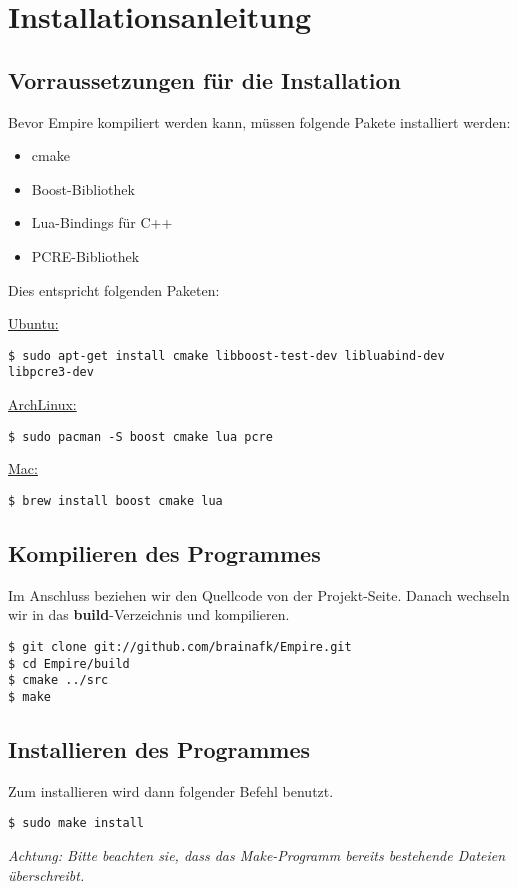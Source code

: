 
\section{Installationsanleitung}

\subsection{Vorraussetzungen für die Installation}
Bevor Empire kompiliert werden kann, müssen folgende Pakete installiert werden:

\begin{itemize}
	\item cmake
	\item Boost-Bibliothek
	\item Lua-Bindings für C++
	\item PCRE-Bibliothek
\end{itemize}

Dies entspricht folgenden Paketen:

\underline{Ubuntu:}
\begin{lstlisting}[style=Bash]
$ sudo apt-get install cmake libboost-test-dev libluabind-dev libpcre3-dev
\end{lstlisting}

\underline{ArchLinux:}
\begin{lstlisting}[style=Bash]
$ sudo pacman -S boost cmake lua pcre
\end{lstlisting}

\underline{Mac:}
\begin{lstlisting}[style=Bash]
$ brew install boost cmake lua
\end{lstlisting}

\subsection{Kompilieren des Programmes}

Im Anschluss beziehen wir den Quellcode von der Projekt-Seite. Danach wechseln wir in das \textbf{build}-Verzeichnis und kompilieren.

\begin{lstlisting}[style=Bash]
$ git clone git://github.com/brainafk/Empire.git
$ cd Empire/build
$ cmake ../src
$ make
\end{lstlisting}

\subsection{Installieren des Programmes}

Zum installieren wird dann folgender Befehl benutzt.

\begin{lstlisting}[style=Bash]
$ sudo make install
\end{lstlisting}

\emph{Achtung: Bitte beachten sie, dass das Make-Programm bereits bestehende Dateien überschreibt.}
